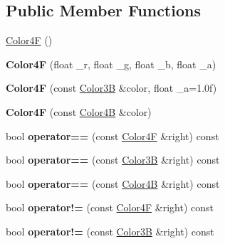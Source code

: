 \subsection*{Public Member Functions}
\begin{DoxyCompactItemize}
\item 
\hyperlink{structColor4F_a63f4f3b495f4a60f691b80d794936e1b}{Color4F} ()
\item 
\mbox{\label{structColor4F_ada58d58832ce18a74cd55911a09c90e4}} 
{\bfseries Color4F} (float \+\_\+r, float \+\_\+g, float \+\_\+b, float \+\_\+a)
\item 
\mbox{\label{structColor4F_a951f12769d6e0d0045a502db80d8ac7d}} 
{\bfseries Color4F} (const \hyperlink{structColor3B}{Color3B} \&color, float \+\_\+a=1.\+0f)
\item 
\mbox{\label{structColor4F_ac3a19273f9abf17e1bfbc17be59a2e35}} 
{\bfseries Color4F} (const \hyperlink{structColor4B}{Color4B} \&color)
\item 
\mbox{\label{structColor4F_a9ec9a5e6420e0f62c6728d9701ba1300}} 
bool {\bfseries operator==} (const \hyperlink{structColor4F}{Color4F} \&right) const
\item 
\mbox{\label{structColor4F_adeb317ce3c66b6a5e81ac56493169a11}} 
bool {\bfseries operator==} (const \hyperlink{structColor3B}{Color3B} \&right) const
\item 
\mbox{\label{structColor4F_a641244497cf2954d0ac6d7955c730561}} 
bool {\bfseries operator==} (const \hyperlink{structColor4B}{Color4B} \&right) const
\item 
\mbox{\label{structColor4F_a5efe5fd20158f257199ce96ba5e9bc4f}} 
bool {\bfseries operator!=} (const \hyperlink{structColor4F}{Color4F} \&right) const
\item 
\mbox{\label{structColor4F_aa1e5d0657931a7ad4f2b3ed09effe05e}} 
bool {\bfseries operator!=} (const \hyperlink{structColor3B}{Color3B} \&right) const
\item 
\mbox{\label{structColor4F_aba168a25e31e6cb760e92ff2ef354175}} 

\end{DoxyCompactItemize}
